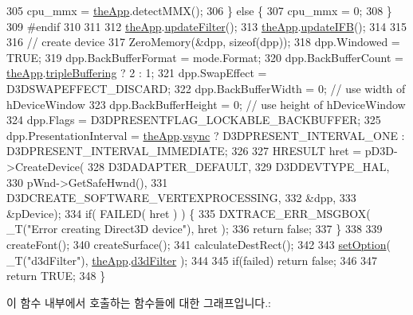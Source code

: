 \begin{DoxyCode}
305         cpu\_mmx = \mbox{\hyperlink{_v_b_a_8cpp_a8095a9d06b37a7efe3723f3218ad8fb3}{theApp}}.detectMMX();
306     \} \textcolor{keywordflow}{else} \{
307         cpu\_mmx = 0;
308     \}
309 \textcolor{preprocessor}{#endif}
310 
311 
312     \mbox{\hyperlink{_v_b_a_8cpp_a8095a9d06b37a7efe3723f3218ad8fb3}{theApp}}.\mbox{\hyperlink{class_v_b_a_afbe0e6f9458f25adb848516537a91747}{updateFilter}}();
313     \mbox{\hyperlink{_v_b_a_8cpp_a8095a9d06b37a7efe3723f3218ad8fb3}{theApp}}.\mbox{\hyperlink{class_v_b_a_ab1caa25635cd40fc3b49b5d325cc65ef}{updateIFB}}();
314 
315 
316     \textcolor{comment}{// create device}
317     ZeroMemory(&dpp, \textcolor{keyword}{sizeof}(dpp));
318     dpp.Windowed = TRUE;
319     dpp.BackBufferFormat = mode.Format;
320     dpp.BackBufferCount = \mbox{\hyperlink{_v_b_a_8cpp_a8095a9d06b37a7efe3723f3218ad8fb3}{theApp}}.\mbox{\hyperlink{class_v_b_a_af597e2c2466efdc6365a5d725651b855}{tripleBuffering}} ? 2 : 1;
321     dpp.SwapEffect = D3DSWAPEFFECT\_DISCARD;
322     dpp.BackBufferWidth = 0; \textcolor{comment}{// use width of hDeviceWindow}
323     dpp.BackBufferHeight = 0; \textcolor{comment}{// use height of hDeviceWindow}
324     dpp.Flags = D3DPRESENTFLAG\_LOCKABLE\_BACKBUFFER;
325     dpp.PresentationInterval = \mbox{\hyperlink{_v_b_a_8cpp_a8095a9d06b37a7efe3723f3218ad8fb3}{theApp}}.\mbox{\hyperlink{class_v_b_a_a84075b77df64f3dc2100159064b79fba}{vsync}} ? D3DPRESENT\_INTERVAL\_ONE : 
      D3DPRESENT\_INTERVAL\_IMMEDIATE;
326 
327     HRESULT hret = pD3D->CreateDevice(
328         D3DADAPTER\_DEFAULT,
329         D3DDEVTYPE\_HAL,
330         pWnd->GetSafeHwnd(),
331         D3DCREATE\_SOFTWARE\_VERTEXPROCESSING,
332         &dpp,
333         &pDevice);
334     \textcolor{keywordflow}{if}( FAILED( hret ) ) \{
335         DXTRACE\_ERR\_MSGBOX( \_T(\textcolor{stringliteral}{"Error creating Direct3D device"}), hret );
336         \textcolor{keywordflow}{return} \textcolor{keyword}{false};
337     \}
338 
339     createFont();
340     createSurface();
341     calculateDestRect();
342 
343     \mbox{\hyperlink{class_direct3_d_display_a9fb19225514b70c7178aa871c9852936}{setOption}}( \_T(\textcolor{stringliteral}{"d3dFilter"}), \mbox{\hyperlink{_v_b_a_8cpp_a8095a9d06b37a7efe3723f3218ad8fb3}{theApp}}.\mbox{\hyperlink{class_v_b_a_a8563e53b73a28a011e656f6fc8a4e5ff}{d3dFilter}} );
344 
345     \textcolor{keywordflow}{if}(failed) \textcolor{keywordflow}{return} \textcolor{keyword}{false};
346 
347     \textcolor{keywordflow}{return} TRUE;  
348 \}
\end{DoxyCode}
이 함수 내부에서 호출하는 함수들에 대한 그래프입니다.\+:
